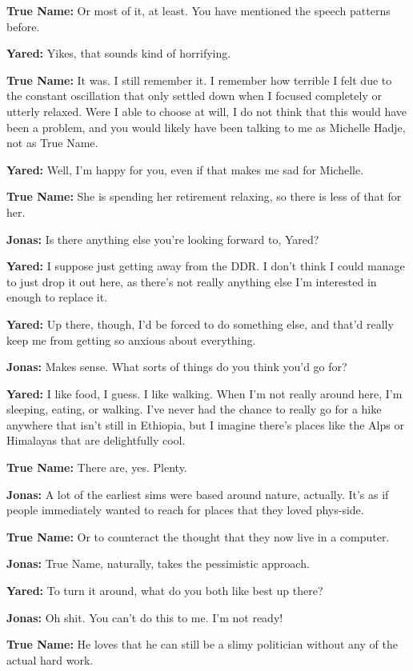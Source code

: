 \textbf{True Name:} Or most of it, at least. You have mentioned the speech patterns before.

\textbf{Yared:} Yikes, that sounds kind of horrifying.

\textbf{True Name:} It was. I still remember it. I remember how terrible I felt due to the constant oscillation that only settled down when I focused completely or utterly relaxed. Were I able to choose at will, I do not think that this would have been a problem, and you would likely have been talking to me as Michelle Hadje, not as True Name.

\textbf{Yared:} Well, I'm happy for you, even if that makes me sad for Michelle.

\textbf{True Name:} She is spending her retirement relaxing, so there is less of that for her.

\textbf{Jonas:} Is there anything else you're looking forward to, Yared?

\textbf{Yared:} I suppose just getting away from the DDR. I don't think I could manage to just drop it out here, as there's not really anything else I'm interested in enough to replace it.

\textbf{Yared:} Up there, though, I'd be forced to do something else, and that'd really keep me from getting so anxious about everything.

\textbf{Jonas:} Makes sense. What sorts of things do you think you'd go for?

\textbf{Yared:} I like food, I guess. I like walking. When I'm not really around here, I'm sleeping, eating, or walking. I've never had the chance to really go for a hike anywhere that isn't still in Ethiopia, but I imagine there's places like the Alps or Himalayas that are delightfully cool.

\textbf{True Name:} There are, yes. Plenty.

\textbf{Jonas:} A lot of the earliest sims were based around nature, actually. It's as if people immediately wanted to reach for places that they loved phys-side.

\textbf{True Name:} Or to counteract the thought that they now live in a computer.

\textbf{Jonas:} True Name, naturally, takes the pessimistic approach.

\textbf{Yared:} To turn it around, what do you both like best up there?

\textbf{Jonas:} Oh shit. You can't do this to me. I'm not ready!

\textbf{True Name:} He loves that he can still be a slimy politician without any of the actual hard work.

